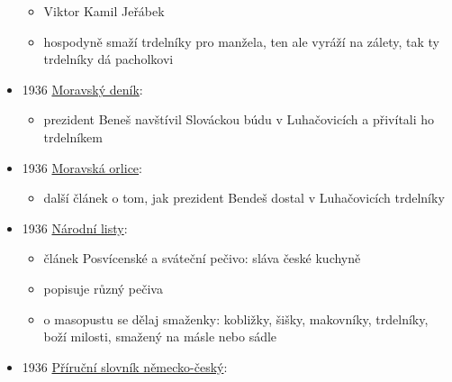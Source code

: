 \begin{itemize}
  \begin{itemize}
  \tightlist
  \item
    Viktor Kamil Jeřábek
  \item
    hospodyně smaží trdelníky pro manžela, ten ale vyráží na zálety, tak
    ty trdelníky dá pacholkovi
  \end{itemize}
\item
  1936
  \href{https://ceskadigitalniknihovna.cz/view/uuid:21c28337-816c-4103-a6ae-143ab29b452a?page=uuid\%3A138254c0-7d8d-11e9-b171-5ef3fc9ae867&fulltext=trdeln\%C3\%ADk\%20OR\%20trdeln\%C3\%ADky\%20OR\%20trdeln\%C3\%ADk\%C5\%AF&source=nkp}{Moravský
  deník}:

  \begin{itemize}
  \tightlist
  \item
    prezident Beneš navštívil Slováckou búdu v Luhačovicích a přivítali
    ho trdelníkem
  \end{itemize}
\item
  1936
  \href{https://ceskadigitalniknihovna.cz/view/uuid:5e938270-0675-11df-93e5-000d606f5dc6?page=uuid:37544fe0-fb63-11de-ba13-000d606f5dc6&fulltext=trdeln\%C3\%AD*&source=mzk}{Moravská
  orlice}:

  \begin{itemize}
  \tightlist
  \item
    další článek o tom, jak prezident Bendeš dostal v Luhačovicích
    trdelníky
  \end{itemize}
\item
  1936
  \href{https://ceskadigitalniknihovna.cz/view/uuid:f2e890b0-435d-11dd-b505-00145e5790ea?page=uuid\%3A6d16d5b9-435f-11dd-b505-00145e5790ea&fulltext=trdeln\%C3\%ADk\%20OR\%20trdeln\%C3\%ADky\%20OR\%20trdeln\%C3\%ADk\%C5\%AF&source=svkhk}{Národní
  listy}:

  \begin{itemize}
  \tightlist
  \item
    článek Posvícenské a sváteční pečivo: sláva české kuchyně
  \item
    popisuje různý pečiva
  \item
    o masopustu se dělaj smaženky: kobližky, šišky, makovníky,
    trdelníky, boží milosti, smažený na másle nebo sádle
  \end{itemize}
\item
  1936
  \href{https://ceskadigitalniknihovna.cz/view/uuid:d4dd6060-bfc4-11e3-aec3-005056827e52?page=uuid\%3A23cc3e33-7f1f-49cd-8c09-67351d084c07&fulltext=trdeln*&source=nkp}{Příruční
  slovník německo-český}:


\end{itemize}
